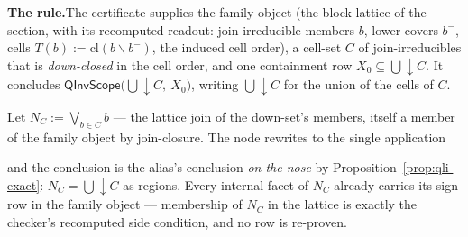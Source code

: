 \textbf{The rule.}\enspace The certificate supplies the family object
(the block lattice of the  section, with its
recomputed readout: join-irreducible members $b$, lower covers $b^-$,
cells $T(b) := \mathrm{cl}(b \smallsetminus b^-)$, the induced cell
order), a cell-set $C$ of join-irreducibles that is \emph{down-closed}
in the cell order, and one containment row
$X_0 \subseteq \bigcup\downarrow C$. It concludes
$\mathsf{QInvScope}\big(\bigcup\downarrow C,\ X_0\big)$, writing
$\bigcup\downarrow C$ for the union of the cells of $C$.

\begin{brecipe}
\label{rec:qli-filled}
Let $N_C := \bigvee_{b \in C} b$ --- the lattice join of the down-set's
members, itself a member of the family object by join-closure. The
 node rewrites to the single 
application
\begin{mathpar}
\end{mathpar}
and the conclusion is the alias's conclusion \emph{on the nose} by
Proposition~\ref{prop:qli-exact}: $N_C = \bigcup\downarrow C$ as
regions. Every internal facet of $N_C$ already carries its sign row in
the family object --- membership of $N_C$ in the lattice is exactly
the checker's recomputed side condition, and no row is re-proven.
\end{brecipe}

